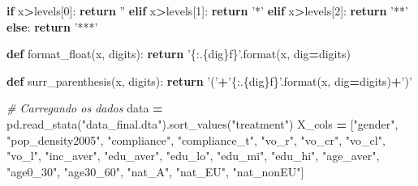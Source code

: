 \documentclass[
]{article}
\newenvironment{Shaded}{\begin{snugshade}}{\end{snugshade}}
\newcommand{\BuiltInTok}[1]{#1}
\newcommand{\CommentTok}[1]{\textcolor[rgb]{0.56,0.35,0.01}{\textit{#1}}}
\newcommand{\ControlFlowTok}[1]{\textcolor[rgb]{0.13,0.29,0.53}{\textbf{#1}}}
\newcommand{\DecValTok}[1]{\textcolor[rgb]{0.00,0.00,0.81}{#1}}
\newcommand{\KeywordTok}[1]{\textcolor[rgb]{0.13,0.29,0.53}{\textbf{#1}}}
\newcommand{\NormalTok}[1]{#1}
\newcommand{\OperatorTok}[1]{\textcolor[rgb]{0.81,0.36,0.00}{\textbf{#1}}}
\newcommand{\SpecialCharTok}[1]{\textcolor[rgb]{0.00,0.00,0.00}{#1}}
\newcommand{\StringTok}[1]{\textcolor[rgb]{0.31,0.60,0.02}{#1}}
\begin{document}
\begin{Shaded}
\begin{Highlighting}[]
    \ControlFlowTok{if}\NormalTok{ x}\OperatorTok{>}\NormalTok{levels[}\DecValTok{0}\NormalTok{]:}
        \ControlFlowTok{return} \StringTok{''}
    \ControlFlowTok{elif}\NormalTok{ x}\OperatorTok{>}\NormalTok{levels[}\DecValTok{1}\NormalTok{]:}
        \ControlFlowTok{return} \StringTok{'*'}
    \ControlFlowTok{elif}\NormalTok{ x}\OperatorTok{>}\NormalTok{levels[}\DecValTok{2}\NormalTok{]:}
        \ControlFlowTok{return} \StringTok{'**'}
    \ControlFlowTok{else}\NormalTok{:}
        \ControlFlowTok{return} \StringTok{'***'}

\KeywordTok{def}\NormalTok{ format_float(x, digits):}
    \ControlFlowTok{return} \StringTok{'\{:.}\SpecialCharTok{\{dig\}}\StringTok{f\}'}\NormalTok{.}\BuiltInTok{format}\NormalTok{(x, dig}\OperatorTok{=}\NormalTok{digits)}

\KeywordTok{def}\NormalTok{ surr_parenthesis(x, digits):}
    \ControlFlowTok{return} \StringTok{'('}\OperatorTok{+}\StringTok{'\{:.}\SpecialCharTok{\{dig\}}\StringTok{f\}'}\NormalTok{.}\BuiltInTok{format}\NormalTok{(x, dig}\OperatorTok{=}\NormalTok{digits)}\OperatorTok{+}\StringTok{')'}


\CommentTok{# Carregando os dados}
\NormalTok{data }\OperatorTok{=}\NormalTok{ pd.read_stata(}\StringTok{"data_final.dta"}\NormalTok{).sort_values(}\StringTok{"treatment"}\NormalTok{)}
\NormalTok{X_cols }\OperatorTok{=}\NormalTok{ [}\StringTok{"gender"}\NormalTok{, }\StringTok{"pop_density2005"}\NormalTok{, }
    \StringTok{"compliance"}\NormalTok{, }\StringTok{"compliance_t"}\NormalTok{, }\StringTok{"vo_r"}\NormalTok{, }\StringTok{"vo_cr"}\NormalTok{, }\StringTok{"vo_cl"}\NormalTok{, }\StringTok{"vo_l"}\NormalTok{, }
    \StringTok{"inc_aver"}\NormalTok{, }\StringTok{"edu_aver"}\NormalTok{, }\StringTok{"edu_lo"}\NormalTok{, }\StringTok{"edu_mi"}\NormalTok{, }\StringTok{"edu_hi"}\NormalTok{, }
    \StringTok{"age_aver"}\NormalTok{, }\StringTok{"age0_30"}\NormalTok{, }\StringTok{"age30_60"}\NormalTok{, }\StringTok{"nat_A"}\NormalTok{, }\StringTok{"nat_EU"}\NormalTok{, }\StringTok{"nat_nonEU"}\NormalTok{]}
    

\end{Highlighting}
\end{Shaded}
\end{document}
